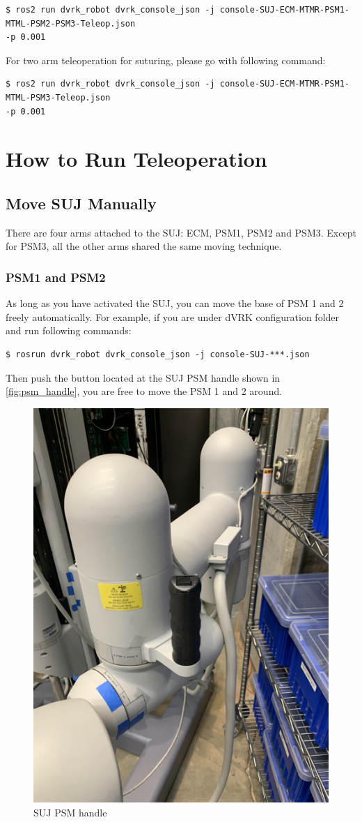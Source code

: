 \begin{verbatim}
$ ros2 run dvrk_robot dvrk_console_json -j console-SUJ-ECM-MTMR-PSM1-MTML-PSM2-PSM3-Teleop.json
-p 0.001
\end{verbatim}

For two arm teleoperation for suturing, please go with following command:

\begin{verbatim}
$ ros2 run dvrk_robot dvrk_console_json -j console-SUJ-ECM-MTMR-PSM1-MTML-PSM3-Teleop.json
-p 0.001
\end{verbatim}

\chapter{How to Run Teleoperation}
\label{ch: Teleop}

\section{Move SUJ Manually}

There are four arms attached to the SUJ: ECM, PSM1, PSM2 and PSM3. Except for PSM3, all the other arms shared the same moving technique.

\subsection{PSM1 and PSM2}

As long as you have activated the SUJ, you can move the base of PSM 1 and 2 freely automatically. For example, if you are under dVRK configuration folder and run following commands: 

\begin{verbatim}
$ rosrun dvrk_robot dvrk_console_json -j console-SUJ-***.json
\end{verbatim}

Then push the button located at the SUJ PSM handle shown in \autoref{fig:psm_handle}, you are free to move the PSM 1 and 2 around.

\begin{figure}[H]
    \centering
    \includegraphics[width=0.4\linewidth]{figures/PSM_handle.png}
    \caption{SUJ PSM handle}
    \label{fig:psm_handle}
\end{figure}

